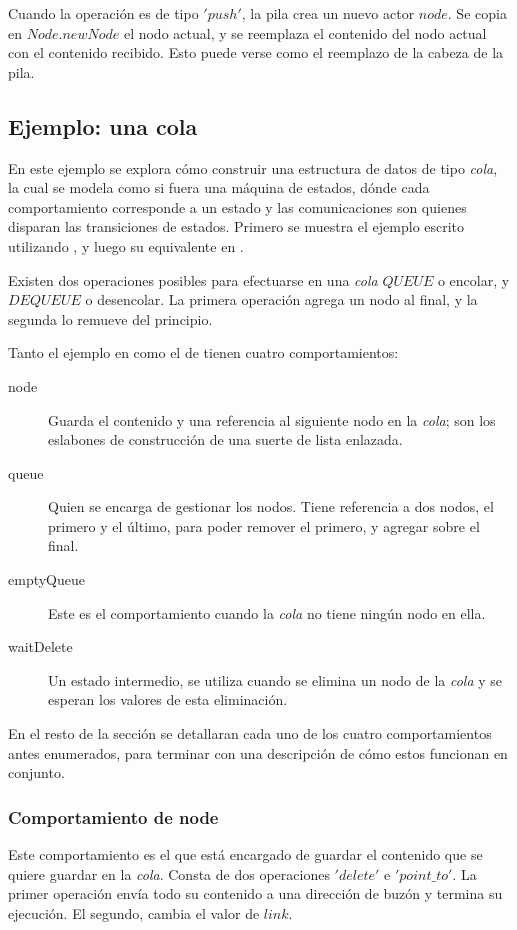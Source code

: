 Cuando la operación es de tipo $'push'$, la pila crea un nuevo actor $node$. Se copia en $Node.newNode$ el nodo actual, y se reemplaza el contenido del nodo actual con el contenido recibido. Esto puede verse como el reemplazo de la cabeza de la pila.

\subsection{Ejemplo: una cola}\label{ejemplo:cola}

En este ejemplo se explora cómo construir una estructura de datos de tipo \textit{cola}, la cual se modela como si fuera una máquina de estados, dónde cada comportamiento corresponde a un estado y las comunicaciones son quienes disparan las transiciones de estados. Primero se muestra el ejemplo escrito utilizando \SAL, y luego su equivalente en \CSP.

Existen dos operaciones posibles para efectuarse en una \textit{cola} $QUEUE$ o encolar, y $DEQUEUE$ o desencolar. La primera operación agrega un nodo al final, y la segunda lo remueve del principio. 

Tanto el ejemplo en \SAL como el de \CSP tienen cuatro comportamientos:

\begin{description}
 \item [node] Guarda el contenido y una referencia al siguiente nodo en la \textit{cola}; son los eslabones de construcción de una suerte de lista enlazada.
 \item [queue] Quien se encarga de gestionar los nodos. Tiene referencia a dos nodos, el primero y el último, para poder remover el primero, y agregar sobre el final.
 \item [emptyQueue] Este es el comportamiento cuando la \textit{cola} no tiene ningún nodo en ella.
 \item [waitDelete] Un estado intermedio, se utiliza cuando se elimina un nodo de la \textit{cola} y se esperan los valores de esta eliminación.
\end{description}

En el resto de la sección se detallaran cada uno de los cuatro comportamientos antes enumerados, para terminar con una descripción de cómo estos funcionan en conjunto.

\subsubsection*{Comportamiento de node}
Este comportamiento es el que está encargado de guardar el contenido que se quiere guardar en la \textit{cola}. Consta de dos operaciones $'delete'$ e $'point\_to'$. La primer operación envía todo su contenido a una dirección de buzón y termina su ejecución. El segundo, cambia el valor de $link$.

